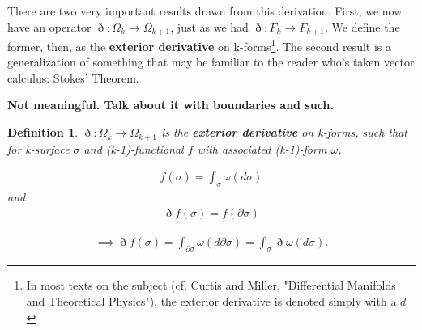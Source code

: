 \documentclass{book}
\newtheorem{defn}[equation]{Definition}
\begin{document}
There are two very important results drawn from this derivation. First, we now have an operator $\eth : \Omega_k \to \Omega_{k+1}$, just as we had $\eth : F_k \to F_{k+1}$. We define the former, then, as the \textbf{exterior derivative} on k-forms\footnote{In most texts on the subject (cf. Curtis and Miller, "Differential Manifolds and Theoretical Physics"), the exterior derivative is denoted simply with a $d$}. The second result is a generalization of something that may be familiar to the reader who's taken vector calculus: Stokes' Theorem. 




\textbf{Not meaningful. Talk about it with boundaries and such.}
\begin{defn}
	$\eth : \Omega_k \to \Omega_{k+1}$ is the \textbf{exterior derivative} on k-forms, such that for k-surface $\sigma$ and (k-1)-functional $f$ with associated (k-1)-form $\omega$, 
	
	\begin{gather}f(\sigma) = \int_{\sigma}\omega(d\sigma)\end{gather} and \begin{gather} \eth f(\sigma) = f(\partial\sigma) \end{gather}
	
	\begin{gather}\implies \eth f(\sigma) = \int_{\partial\sigma} \omega(d\partial\sigma) = \int_{\sigma} \eth\omega(d\sigma).\end{gather} 
\end{defn}




 
 
 
 
 
 

\end{document}
